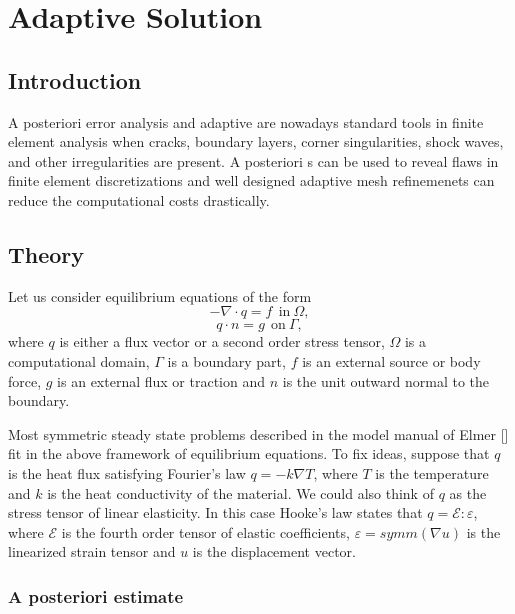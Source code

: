 \chapter{Adaptive Solution}

\noindent

\section{Introduction}

A posteriori error analysis and adaptive  are nowadays
standard tools in finite element analysis when cracks, boundary layers,
corner singularities, shock waves, and other irregularities are present.
A posteriori s can be used to reveal flaws in finite
element discretizations and well designed adaptive mesh refinemenets
can reduce the computational costs drastically.

\section{Theory}

Let us consider equilibrium equations of the form
\begin{equation}
-\nabla \cdot q = f \ \ \mathrm{in} \ \Omega, \label{equilibrium}
\end{equation}
\begin{equation}
q \cdot n = g \ \ \mathrm{on} \ \Gamma, \label{boundarycondition}
\end{equation}
where $q$ is either a flux vector or a second order stress tensor, $\Omega$
is a computational domain, $\Gamma$ is a boundary part, $f$ is an external
source or body force, $g$ is an external flux or traction and $n$ is the
unit outward normal to the boundary.

Most symmetric steady state problems described in the model manual of
Elmer [] fit in the above framework of equilibrium equations. To fix
ideas, suppose that $q$ is the heat flux satisfying Fourier's law
$q=-k \nabla T$, where $T$ is the temperature and $k$ is the heat
conductivity of the material. We could also think of $q$ as the stress
tensor of linear elasticity. In this case Hooke's law states that 
$q = \mathcal{E} : \varepsilon$, where $\mathcal E$ is the fourth order
tensor of elastic coefficients, $\varepsilon = symm(\nabla u)$ is the 
linearized strain tensor and $u$ is the displacement vector.

\subsection{A posteriori estimate}

